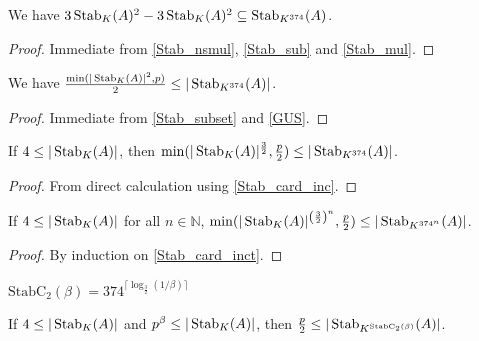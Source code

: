 \begin{lemma}
    \label{Stab_subset}
    \leanok
    We have $3 \operatorname{\operatorname{Stab}}_K(A)^2 - 3 \operatorname{\operatorname{Stab}}_K(A)^2 \subseteq \operatorname{\operatorname{Stab}}_{K^{374}}(A)$.
\end{lemma}

\begin{proof}
    \leanok
    Immediate from \ref{Stab_nsmul}, \ref{Stab_sub} and \ref{Stab_mul}.
\end{proof}

\begin{lemma}
    \label{Stab_card_inc}
    \leanok
    We have $\frac{\min(|\operatorname{\operatorname{Stab}}_K(A)|^2, p)}2 \leq |\operatorname{\operatorname{Stab}}_{K^{374}}(A)|$.
\end{lemma}

\begin{proof}
    \leanok
    Immediate from \ref{Stab_subset} and \ref{GUS}.
\end{proof}

\begin{lemma}
    \label{Stab_card_inct}
    \leanok
    If $4 \leq |\operatorname{\operatorname{Stab}}_K(A)|$, then $\min(|\operatorname{\operatorname{Stab}}_K(A)|^{\frac32}, \frac p2) \leq |\operatorname{\operatorname{Stab}}_{K^{374}}(A)|$.
\end{lemma}

\begin{proof}
    \leanok
    From direct calculation using \ref{Stab_card_inc}.
\end{proof}

\begin{lemma}
    \label{Stab_card_inc_rep}
    \leanok
    If $4 \leq |\operatorname{\operatorname{Stab}}_K(A)|$ for all $n \in \mathbb{N}$,
    $\min(|\operatorname{\operatorname{Stab}}_K(A)|^{\left(\frac32\right)^n}, \frac p2) \leq |\operatorname{\operatorname{Stab}}_{K^{374^n}}(A)|$.
\end{lemma}

\begin{proof}
    \leanok
    By induction on \ref{Stab_card_inct}.
\end{proof}

\begin{definition}
    \label{StabC_2}
    \leanok
    $\mathrm{StabC}_2(\beta) = 374^{\lceil \log_{\frac32}(1 / \beta) \rceil}$
\end{definition}

\begin{lemma}
    \label{Stab_fullt}
    \leanok
    If $4 \leq |\operatorname{\operatorname{Stab}}_K(A)|$ and $p^\beta \leq |\operatorname{\operatorname{Stab}}_K(A)|$,
    then $\frac{p}2 \leq |\operatorname{\operatorname{Stab}}_{K^{\mathrm{StabC}_2(\beta)}}(A)|$.
\end{lemma}

